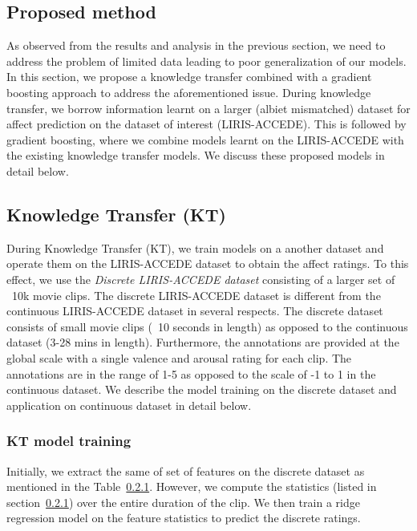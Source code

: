 \documentclass{article}
\begin{document}
\subsection{Proposed method}
As observed from the results and analysis in the previous section, we need to address the problem of limited data leading to poor generalization of our models.
In this section, we propose a knowledge transfer combined with a gradient boosting approach to address the aforementioned issue.
During knowledge transfer, we borrow information learnt on a larger (albiet mismatched) dataset for affect prediction on the dataset of interest (LIRIS-ACCEDE).
This is followed by gradient boosting, where we combine models learnt on the LIRIS-ACCEDE with the existing knowledge transfer models.
We discuss these proposed models in detail below. 

\subsection{Knowledge Transfer (KT)}
During Knowledge Transfer (KT), we train models on a another dataset and operate them on the LIRIS-ACCEDE dataset to obtain the affect ratings.
To this effect, we use the {\it Discrete LIRIS-ACCEDE dataset} consisting of a larger set of ~10k movie clips.  
The discrete LIRIS-ACCEDE dataset is different from the continuous LIRIS-ACCEDE dataset in several respects.
The discrete dataset consists of small movie clips (~10 seconds in length) as opposed to the continuous dataset (3-28 mins in length).
Furthermore, the annotations are provided at the global scale with a single valence and arousal rating for each clip.
The annotations are in the range of 1-5 as opposed to the scale of -1 to 1 in the continuous dataset. 
We describe the model training on the discrete dataset and application on continuous dataset in detail below.

\subsubsection{KT model training}
Initially, we extract the same of set of features on the discrete dataset as mentioned in the Table~\ref{}.
However, we compute the statistics (listed in section~\ref{}) over the entire duration of the clip.
We then train a ridge regression model on the feature statistics to predict the discrete ratings.
\end{document}
